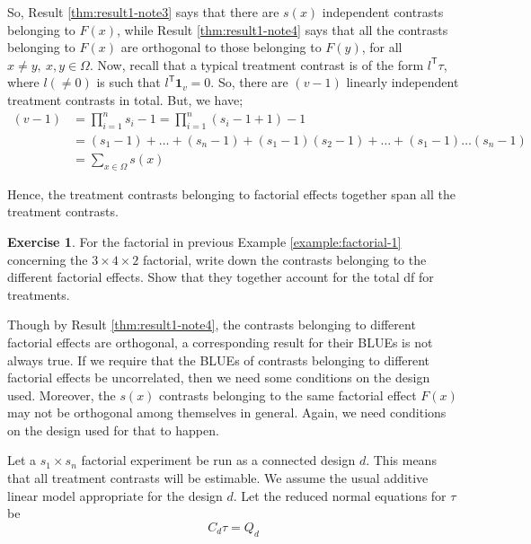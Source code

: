 \documentclass[12pt]{article}
\newcommand{\transpose}{\mathsf{T}}
\theoremstyle{definition}
\newtheorem{ex}{Exercise}
\newenvironment{exercise}{
\begin{tcolorbox}[colback=red!5!white,colframe=red!75!black, parbox = false]\begin{ex} }{\end{ex}\end{tcolorbox} }
\begin{document}
So, Result \ref{thm:result1-note3} says that there are $s(x)$ independent contrasts belonging to $F(x)$, while Result \ref{thm:result1-note4} says that all the contrasts belonging to $F(x)$ are orthogonal to those belonging to $F(y)$, for all $x\neq y, \ x, y \in \Omega$. Now, recall that a typical treatment contrast is of the form $l^{\transpose}\tau$, where $l (\neq 0)$ is such that $l^{\transpose}\mathbf{1}_v=0$. So, there are $(v-1)$ linearly independent treatment contrasts in total. But, we have;
\begin{align*}
    (v-1) & = \prod_{i=1}^{n}s_i - 1 = \prod_{i=1}^{n}(s_i - 1 + 1) - 1\\
    & = (s_1-1) + \ldots + (s_n-1) + (s_1-1)(s_2-1) + \ldots + (s_1-1)\ldots(s_n-1)\\
    & = \sum_{x\in \Omega} s(x)
\end{align*}

Hence, the treatment contrasts belonging to factorial effects together span all the treatment contrasts.
	
	
\begin{exercise}
    For the factorial in previous Example \ref{example:factorial-1} concerning the $3\times 4\times 2$ factorial, write down the contrasts belonging to the different factorial effects. Show that they together account for the total df for treatments.
\end{exercise}
	

Though by Result \ref{thm:result1-note4}, the contrasts belonging to different factorial effects are orthogonal, a corresponding result for their BLUEs is not always true. If we require that the BLUEs of contrasts belonging to different factorial effects be uncorrelated, then we need some  conditions on the design used. Moreover, the  $s(x)$ contrasts  belonging to the same factorial effect $F(x)$ may not be orthogonal among themselves in general.  Again, we need conditions on the design used for that to happen. 
	

Let a $s_1\times s_n$ factorial experiment be run as a connected design $d$. This means that all treatment contrasts will be estimable. We assume the usual additive linear model appropriate for the design $d$. Let the reduced normal equations  for $\tau$ be $$C_d\tau = Q_d$$
\end{document}
